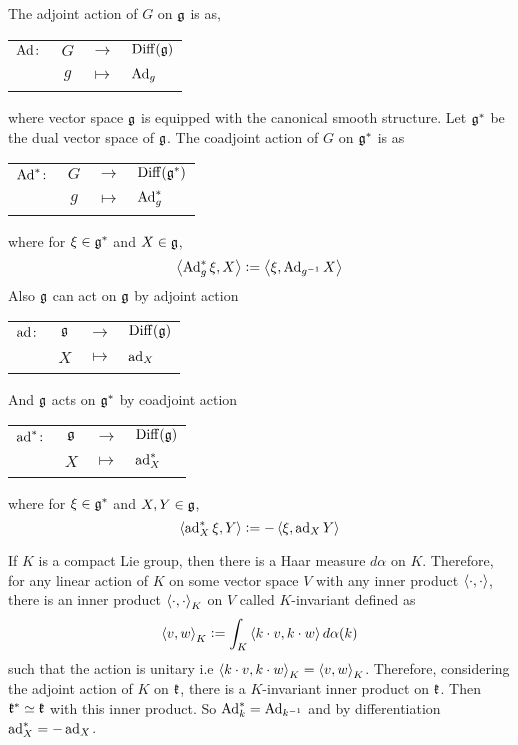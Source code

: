 \documentclass[a4paper,12pt]{article}
\begin{document}
	\begin{exam}
		The adjoint action of $G$ on $\mathfrak{g}$ is as, 
		\begin{center}
			\begin{tabular}{l c c l}
				$\operatorname{Ad} \colon$ & $G$ & $\longrightarrow$ & $\operatorname{Diff}(\mathfrak{g})$ \\
				~ & $g$ & $\longmapsto$ & $\operatorname{Ad}_g$
			\end{tabular}
		\end{center}
		where vector space $\mathfrak{g}$ is equipped with the canonical smooth structure. Let $\mathfrak{g}^*$ be the dual vector space of $\mathfrak{g}$. The coadjoint action of $G$ on $\mathfrak{g}^*$ is as
		\begin{center}
			\begin{tabular}{l c c l}
				$\operatorname{Ad}^* \colon$ & $G$ & $\longrightarrow$ & $\operatorname{Diff}(\mathfrak{g}^*)$ \\
				~ & $g$ & $\longmapsto$ & $\operatorname{Ad}^*_g$
			\end{tabular}
		\end{center}
		where for $\xi \in \mathfrak{g}^*$ and $X \in \mathfrak{g}$,
		\begin{equation*}
			\left\langle \operatorname{Ad}^*_g\xi,X \right\rangle \vcentcolon= \left\langle \xi,\operatorname{Ad}_{g^{-1}}X \right\rangle
		\end{equation*}
		Also $\mathfrak{g}$ can act on $\mathfrak{g}$ by adjoint action
		\begin{center}
			\begin{tabular}{l c c l}
				$\operatorname{ad} \colon$ & $\mathfrak{g}$ & $\longrightarrow$ & $\operatorname{Diff}(\mathfrak{g})$ \\
				~ & $X$ & $\longmapsto$ & $\operatorname{ad}_X$
			\end{tabular}
		\end{center}
		And  $\mathfrak{g}$ acts on $\mathfrak{g}^*$ by coadjoint action
		\begin{center}
			\begin{tabular}{l c c l}
				$\operatorname{ad}^* \colon$ & $\mathfrak{g}$ & $\longrightarrow$ & $\operatorname{Diff}(\mathfrak{g})$ \\
				~ & $X$ & $\longmapsto$ & $\operatorname{ad}^*_X$
			\end{tabular}
		\end{center}
		where for $\xi \in \mathfrak{g}^*$ and $X,Y \in \mathfrak{g}$,
		\begin{equation*}
			\left\langle \operatorname{ad}^*_X\xi,Y \right\rangle \vcentcolon= -\left\langle \xi,\operatorname{ad}_XY \right\rangle
		\end{equation*}
	\end{exam}
	\begin{rem}
		If $K$ is a compact Lie group, then there is a Haar measure $d\alpha$ on $K$. Therefore, for any linear action of $K$ on some vector space $V$ with any inner product $\left\langle \cdot,\cdot \right\rangle$, there is an inner product $\left\langle \cdot,\cdot \right\rangle_K$ on $V$ called $K$-invariant defined as
		\begin{equation*}
			\left\langle v,w \right\rangle_K \vcentcolon= \int_K \left\langle k \cdot v,k\cdot w \right\rangle d\alpha(k)
		\end{equation*}
		such that the action is unitary i.e $\left\langle k \cdot v,k\cdot w \right\rangle_K = \left\langle v,w \right\rangle_K$. Therefore, considering the adjoint action of $K$ on $\mathfrak{k}$, there is a $K$-invariant inner product on $\mathfrak{k}$. Then $\mathfrak{k}^* \simeq \mathfrak{k}$ with this inner product. So $\operatorname{Ad}^*_k = \operatorname{Ad}_{k^{-1}}$ and by differentiation $\operatorname{ad}^*_X = -\operatorname{ad}_X$.
	\end{rem}
\end{document}
